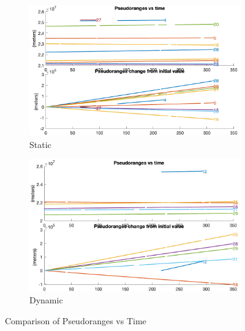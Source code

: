         \begin{figure}[h!]
            \centering
            \begin{subfigure}{0.23\textwidth}
                \includegraphics[width=\textwidth]{images/tests/Monte_Cappuccini/png/Samsung_A51_Monte_Cappuccini_fig1.png}
                \caption{Static}
                \label{fig:static_pseudoranges_a}
            \end{subfigure}
            \hfill
            \begin{subfigure}{0.23\textwidth}
                \includegraphics[width=\textwidth]{images/tests/Tram_15_trip_Castello_to_Pescatore/filtered/Samsung_A51_Tram_15_trip_Castello_to_Pescatore_fig1.png}
                \caption{Dynamic}
                \label{fig:static_pseudoranges_b}
            \end{subfigure}
            \vspace{0.35cm}
            \caption{Comparison of Pseudoranges vs Time}
            \label{fig:pseudoranges_comparison}
        \end{figure}

